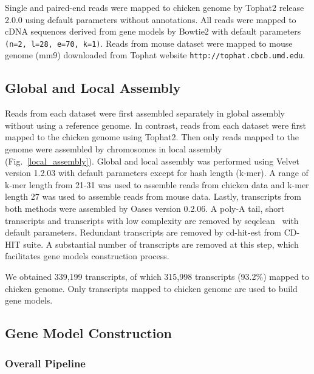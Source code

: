 \documentclass[10pt]{article}
\begin{document}
Single and paired-end reads were mapped to chicken genome by
Tophat2\cite{Trapnell:2009dp} release 2.0.0 using default parameters without
annotations.  All reads were mapped to cDNA sequences derived from gene models
by Bowtie2\cite{Langmead:2009fv} with default parameters \texttt{(n=2, l=28,
e=70, k=1)}.  Reads from mouse dataset were mapped to mouse genome (mm9)
downloaded from Tophat website \texttt{http://tophat.cbcb.umd.edu}.

\subsection*{Global and Local Assembly}

Reads from each dataset were first assembled separately in global assembly
without using a reference genome.  In contrast, reads from each dataset were
first mapped to the chicken genome using Tophat2.  Then only reads mapped to the
genome were assembled by chromosomes in local assembly
(Fig.~\ref{local_assembly}).  Global and local assembly was performed using
Velvet version 1.2.03\cite{Zerbino:2008vu} with default parameters except for
hash length (k-mer).  A range of k-mer length from 21-31 was used to assemble
reads from chicken data and k-mer length 27 was used to assemble reads from
mouse data.  Lastly, transcripts from both methods were assembled by Oases
version 0.2.06\cite{Schulz:2012je}.
A poly-A tail, short transcripts and transcripts with low complexity are removed
by seqclean~\cite{seqclean} with default parameters.  Redundant transcripts are
removed by cd-hit-est from CD-HIT suite\cite{Li:2006hr}.  A substantial number
of transcripts are removed at this step, which facilitates gene models
construction process.

We obtained 339,199 transcripts, of which 315,998 transcripts (93.2\%) mapped
to chicken genome.  Only transcripts mapped to chicken genome are used to build
gene models.

\subsection*{Gene Model Construction}

\subsubsection*{Overall Pipeline}
\end{document}
